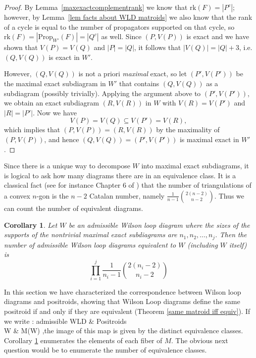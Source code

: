 \documentclass[11pt]{article}
\newcommand{\rk}{\textrm{rk} }
\def\bas #1\eas{\begin{align*} #1 \end{align*}}
\newcommand{\Prop}{\textrm{Prop}}
\newtheorem{cor}[thm]{Corollary}
\theoremstyle{remark}
\theoremstyle{definition}
\begin{document}
\begin{proof}
By Lemma~\ref{maxexactcomplementrank} we know that $\rk(F) = |P^c|$; however, by Lemma~\ref{lem facts about WLD matroids} we also know that the rank of a cycle is equal to the number of propagators supported on that cycle, so $\rk(F) = |\Prop_{W'}(F)| = |Q^c|$ as well. Since $(P,V(P))$ is exact and we have shown that $V(P) = V(Q)$ and $|P| = |Q|$, it follows that $|V(Q)| = |Q| + 3$, i.e.  $(Q,V(Q))$ is exact in $W'$.

However, $(Q,V(Q))$ is not a priori {\em maximal} exact, so let $(P',V(P'))$ be the maximal exact subdiagram in $W'$ that contains $(Q,V(Q))$ as a subdiagram (possibly trivially). Applying the argument above to $(P',V(P'))$, we obtain an exact subdiagram $(R,V(R))$ in $W$ with $V(R) = V(P')$ and $|R| = |P'|$. Now we have
\[V(P) = V(Q) \subseteq V(P') = V(R),\]
which implies that $(P,V(P)) = (R,V(R))$ by the maximality of $(P,V(P))$, and hence $(Q,V(Q)) = (P',V(P'))$ is maximal exact in $W'$.
\end{proof}


Since there is a unique way to decompose $W$ into maximal exact subdiagrams, it is logical to ask how many diagrams there are in an equivalence class. It is a classical fact (see for instance Chapter 6 of \cite{Stanley}) that the number of triangulations of a convex $n$-gon is the $n-2$ Catalan number, namely $\frac{1}{n-1}\binom{2(n-2)}{n-2}$.  Thus we can count the number of equivalent diagrams.

\begin{cor}\label{number of equiv diagrams}
  Let $W$ be an admissible Wilson loop diagram where the sizes of the supports of the nontrivial maximal exact subdiagrams are $n_1, n_2, \ldots, n_j$.  Then the number of admissible Wilson loop diagrams equivalent to $W$ (including $W$ itself) is
  \[
  \prod_{i=1}^{j} \frac{1}{n_i-1}\binom{2(n_i-2)}{n_i-2}
  \]
\end{cor}

In this section we have characterized the correspondence between Wilson loop diagrams and positroids, showing that Wilson Loop diagrams define the same positroid if and only if they are equivalent (Theorem \ref{same matroid iff equiv}). If we write \bas M: \textrm{admissible \; WLD} & \rightarrow \textrm{Positroids} \\ W & \rightarrow M(W) \;,\eas the image of this map is given by the distinct equivalence classes. Corollary \ref{number of equiv diagrams} enumerates the elements of each fiber of $M$.  The obvious next question would be to enumerate the number of equivalence classes. 
\end{document}
